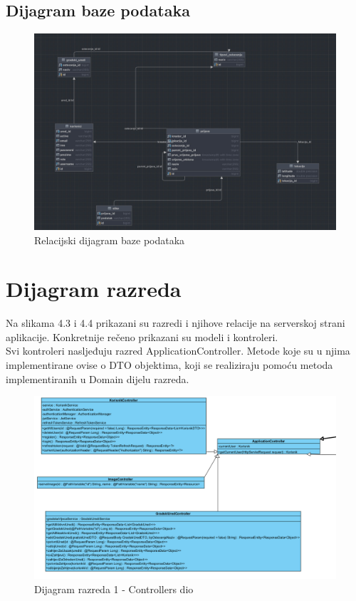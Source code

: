 			\subsection{Dijagram baze podataka}
				\begin{figure}[H]
			\includegraphics[scale=0.3]{slike/erBaza.PNG} %
			\centering
			\caption{Relacijski dijagram baze podataka}
			\label{fig:bazapod}
		\end{figure}
			
			\eject
			
			
		\section{Dijagram razreda}
		
			Na slikama 4.3 i 4.4 prikazani su razredi i njihove relacije na serverskoj strani aplikacije. Konkretnije rečeno prikazani su modeli i kontroleri. \\
			
			Svi kontroleri nasljeđuju razred ApplicationController. Metode koje su u njima implementirane ovise o DTO objektima, koji se realiziraju pomoću metoda implementiranih u Domain dijelu razreda.
			
			
				\begin{figure}[H]
			\includegraphics[scale=0.65]{slike/kontroleri1.PNG} %
			\centering
			\caption{Dijagram razreda 1 - Controllers dio} 
			\label{fig:ijagraz2}
		\end{figure}
		
